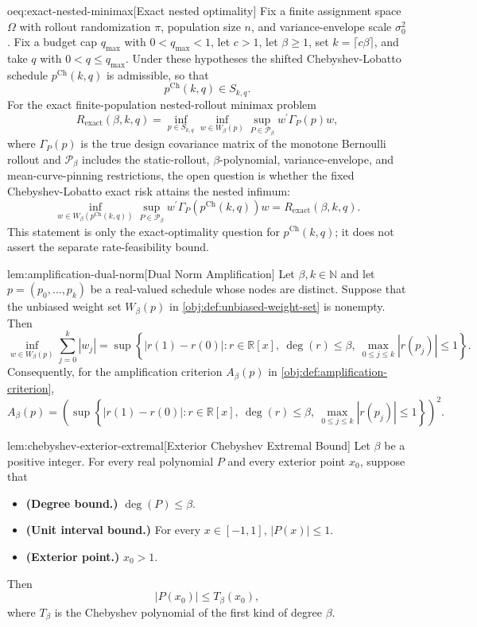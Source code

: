 \begin{remarkv}{oeq:exact-nested-minimax}[Exact nested optimality]
Fix a finite assignment space \(\Omega\) with rollout randomization \(\pi\), population size \(n\), and variance-envelope scale \(\sigma_0^2\). Fix a budget cap \(q_{\max}\) with \(0<q_{\max}<1\), let \(c>1\), let \(\beta\ge 1\), set \(k=\lceil c\beta\rceil\), and take \(q\) with \(0<q\le q_{\max}\). Under these hypotheses the shifted Chebyshev-Lobatto schedule \(p^{\mathrm{Ch}}(k,q)\) is admissible, so that
\[
p^{\mathrm{Ch}}(k,q)\in S_{k,q}.
\]
For the exact finite-population nested-rollout minimax problem
\[
R_{\mathrm{exact}}(\beta,k,q)
=
\inf_{p\in S_{k,q}}
\inf_{w\in W_\beta(p)}
\sup_{P\in\mathcal P_\beta}
w^\prime \Gamma_P(p) w,
\]
where \(\Gamma_P(p)\) is the true design covariance matrix of the monotone Bernoulli rollout and \(\mathcal P_\beta\) includes the static-rollout, \(\beta\)-polynomial, variance-envelope, and mean-curve-pinning restrictions, the open question is whether the fixed Chebyshev-Lobatto exact risk attains the nested infimum:
\[
\inf_{w\in W_\beta(p^{\mathrm{Ch}}(k,q))}
\sup_{P\in\mathcal P_\beta}
w^\prime \Gamma_P(p^{\mathrm{Ch}}(k,q)) w
=
R_{\mathrm{exact}}(\beta,k,q).
\]
This statement is only the exact-optimality question for \(p^{\mathrm{Ch}}(k,q)\); it does not assert the separate rate-feasibility bound.
\end{remarkv}

\begin{lemmav}{lem:amplification-dual-norm}[Dual Norm Amplification]
Let \(\beta,k\in\mathbb N\) and let \(p=(p_0,\ldots,p_k)\) be a real-valued schedule whose nodes are distinct. Suppose that the unbiased weight set \(W_\beta(p)\) in \cref{obj:def:unbiased-weight-set} is nonempty. Then
\[
\inf_{w\in W_\beta(p)} \sum_{j=0}^k |w_j|
=
\sup\left\{
|r(1)-r(0)|:
r\in\mathbb R[x],\ \deg(r)\le \beta,\ \max_{0\le j\le k}|r(p_j)|\le 1
\right\}.
\]
Consequently, for the amplification criterion \(A_\beta(p)\) in \cref{obj:def:amplification-criterion},
\[
A_\beta(p)
=
\left(
\sup\left\{
|r(1)-r(0)|:
r\in\mathbb R[x],\ \deg(r)\le \beta,\ \max_{0\le j\le k}|r(p_j)|\le 1
\right\}
\right)^2 .
\]
\end{lemmav}

\begin{lemmav}{lem:chebyshev-exterior-extremal}[Exterior Chebyshev Extremal Bound]
Let $\beta$ be a positive integer. For every real polynomial $P$ and every exterior point $x_0$, suppose that
\begin{itemize}
\item \textbf{(Degree bound.)} $\deg(P)\le \beta$.
\item \textbf{(Unit interval bound.)} For every $x\in[-1,1]$, $|P(x)|\le 1$.
\item \textbf{(Exterior point.)} $x_0>1$.
\end{itemize}
Then
\[
|P(x_0)|\le T_\beta(x_0),
\]
where $T_\beta$ is the Chebyshev polynomial of the first kind of degree $\beta$.
\end{lemmav}

